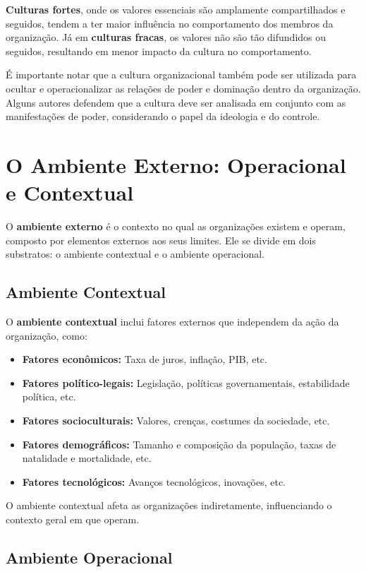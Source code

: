\textbf{Culturas fortes}, onde os valores essenciais são amplamente compartilhados e seguidos, tendem a ter maior influência no comportamento dos membros da organização. Já em \textbf{culturas fracas}, os valores não são tão difundidos ou seguidos, resultando em menor impacto da cultura no comportamento.

É importante notar que a cultura organizacional também pode ser utilizada para ocultar e operacionalizar as relações de poder e dominação dentro da organização. Alguns autores defendem que a cultura deve ser analisada em conjunto com as manifestações de poder, considerando o papel da ideologia e do controle.

\section{O Ambiente Externo: Operacional e Contextual}

O \textbf{ambiente externo} é o contexto no qual as organizações existem e operam, composto por elementos externos aos seus limites. Ele se divide em dois substratos: o ambiente contextual e o ambiente operacional.

\subsection{Ambiente Contextual}

O \textbf{ambiente contextual} inclui fatores externos que independem da ação da organização, como:

\begin{itemize}
    \item \textbf{Fatores econômicos:} Taxa de juros, inflação, PIB, etc.
    \item \textbf{Fatores político-legais:} Legislação, políticas governamentais, estabilidade política, etc.
    \item \textbf{Fatores socioculturais:} Valores, crenças, costumes da sociedade, etc.
    \item \textbf{Fatores demográficos:} Tamanho e composição da população, taxas de natalidade e mortalidade, etc.
    \item \textbf{Fatores tecnológicos:} Avanços tecnológicos, inovações, etc.
\end{itemize}

O ambiente contextual afeta as organizações indiretamente, influenciando o contexto geral em que operam.

\subsection{Ambiente Operacional}

